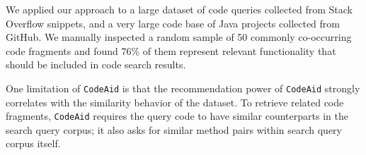 \documentclass[conference]{IEEEtran}
\newcommand{\ttt}[1]{\tt\small{#1}}
\newcommand{\tool}{{\ttt CodeAid}}
\begin{document}
We applied our approach to a large dataset of code queries collected
from Stack Overflow snippets, and a very large code base of Java
projects collected from GitHub.  We manually inspected a random sample of 50 commonly co-occurring code fragments and found 76\% of them represent relevant functionality that should be included in code search results.

One limitation of {\tool} is that the recommendation power of {\tool} strongly correlates with the similarity behavior of the dataset. To retrieve related code fragments, {\tool} requires the query code to have similar counterparts in the search query corpus; it also asks for similar method pairs within search query corpus itself. 






\end{document}
